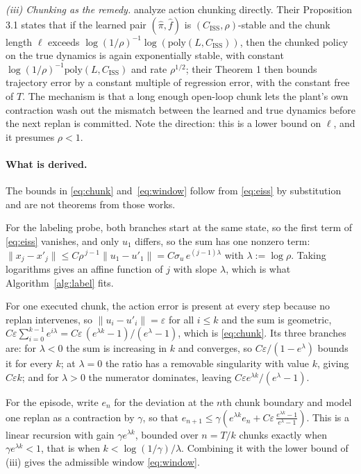 \emph{(iii) Chunking as the remedy.} \citet{zhang2025chunking} analyze
action chunking directly. Their Proposition 3.1 states that if the learned pair
$(\hat\pi,\hat f)$ is $(C_{\text{ISS}},\rho)$-stable and the chunk length
$\ell$ exceeds $\log(1/\rho)^{-1}\log(\mathrm{poly}(L,C_{\text{ISS}}))$, then the
chunked policy on the true dynamics is again exponentially stable, with constant
$\log(1/\rho)^{-1}\mathrm{poly}(L,C_{\text{ISS}})$ and rate $\rho^{1/2}$; their
Theorem 1 then bounds trajectory error by a constant multiple of regression
error, with the constant free of $T$. The mechanism is that a long enough
open-loop chunk lets the plant's own contraction wash out the mismatch between
the learned and true dynamics before the next replan is committed. Note the
direction: this is a lower bound on $\ell$, and it presumes $\rho<1$.

\paragraph{What is derived.}
The bounds in \eqref{eq:chunk} and~\eqref{eq:window} follow from
\eqref{eq:eiss} by substitution and are not theorems from those works.

For the labeling probe, both branches start at the same state, so the first term
of \eqref{eq:eiss} vanishes, and only $u_1$ differs, so the sum has one nonzero
term:
$\lVert x_j - x'_j\rVert \le C\rho^{\,j-1}\lVert u_1 - u'_1 \rVert
= C\sigma_u\,e^{(j-1)\lambda}$ with $\lambda := \log\rho$. Taking logarithms
gives an affine function of $j$ with slope $\lambda$, which is what
Algorithm~\ref{alg:label} fits.

For one executed chunk, the action error is present at every step because no
replan intervenes, so $\lVert u_i - u'_i\rVert = \varepsilon$ for all $i \le k$
and the sum is geometric,
$C\varepsilon\sum_{i=0}^{k-1} e^{i\lambda}
= C\varepsilon\,(e^{\lambda k}-1)/(e^{\lambda}-1)$,
which is \eqref{eq:chunk}. Its three branches are: for $\lambda<0$ the sum is
increasing in $k$ and converges, so $C\varepsilon/(1-e^{\lambda})$ bounds it for
every $k$; at $\lambda=0$ the ratio has a removable singularity with value $k$,
giving $C\varepsilon k$; and for $\lambda>0$ the numerator dominates, leaving
$C\varepsilon e^{\lambda k}/(e^{\lambda}-1)$.

For the episode, write $e_n$ for the deviation at the $n$th chunk boundary and
model one replan as a contraction by $\gamma$, so that
$e_{n+1} \le \gamma\!\left(e^{\lambda k} e_n
+ C\varepsilon\,\frac{e^{\lambda k}-1}{e^{\lambda}-1}\right)$.
This is a linear recursion with gain $\gamma e^{\lambda k}$, bounded over
$n = T/k$ chunks exactly when $\gamma e^{\lambda k} < 1$, that is when
$k < \log(1/\gamma)/\lambda$. Combining it with the lower bound of (iii) gives
the admissible window \eqref{eq:window}.

